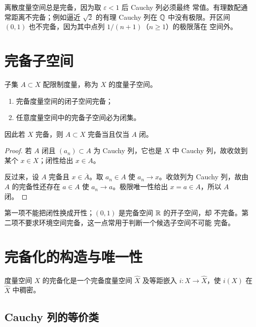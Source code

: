 离散度量空间总是完备，因为取 \(\varepsilon<1\) 后 Cauchy 列必须最终
常值。有理数配通常距离不完备；例如逼近 \(\sqrt2\) 的有理 Cauchy 列在
\(\mathbb{Q}\) 中没有极限。开区间 \((0,1)\) 也不完备，因为其中点列
\(1/(n+1)\)（\(n\ge1\)）的极限落在
空间外。

\section{完备子空间}

子集 \(A\subset X\) 配限制度量，称为 \(X\) 的度量子空间。

\begin{theorem}[完备子空间判据]
\label{thm:complete-subspace-closed}
\begin{enumerate}[label=\textup{(\roman*)}]
 \item 完备度量空间的闭子空间完备；
 \item 任意度量空间中的完备子空间必为闭集。
\end{enumerate}
因此若 \(X\) 完备，则 \(A\subset X\) 完备当且仅当 \(A\) 闭。
\end{theorem}

\begin{proof}
若 \(A\) 闭且 \((a_n)\subset A\) 为 Cauchy 列，它也是 \(X\) 中 Cauchy
列，故收敛到某个 \(x\in X\)；闭性给出 \(x\in A\)。

反过来，设 \(A\) 完备且 \(x\in\overline A\)。取 \(a_n\in A\) 使
\(a_n\to x\)。收敛列为 Cauchy 列，故由 \(A\) 的完备性还存在
\(a\in A\) 使 \(a_n\to a\)。极限唯一性给出 \(x=a\in A\)，所以
\(A\) 闭。
\end{proof}

第一项不能把闭性换成开性；\((0,1)\) 是完备空间 \(\mathbb{R}\) 的开子空间，却
不完备。第二项不要求环境空间完备，这一点常用于判断一个候选子空间不可能
完备。

\section{完备化的构造与唯一性}

\begin{definition}[完备化]
度量空间 \(X\) 的完备化是一个完备度量空间 \(\widehat X\) 及等距嵌入
\(i:X\to\widehat X\)，使 \(i(X)\) 在 \(\widehat X\) 中稠密。
\end{definition}

\subsection{Cauchy 列的等价类}

